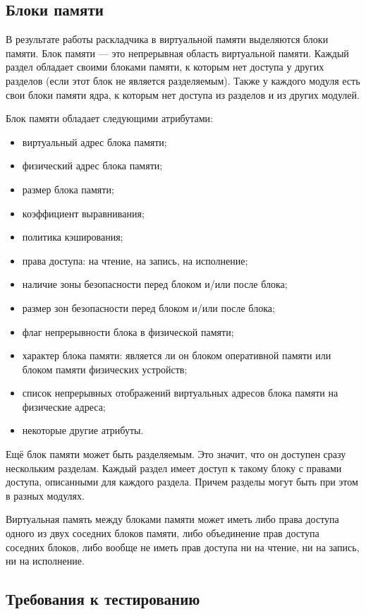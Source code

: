 \documentclass[oneside,senior,etd]{BYUPhys}
\begin{document}
\subsection{Блоки памяти}

В результате работы раскладчика в виртуальной памяти выделяются блоки памяти.
Блок памяти — это непрерывная область виртуальной памяти.
Каждый раздел обладает своими блоками памяти, к которым нет доступа у других разделов
(если этот блок не является разделяемым). Также у каждого модуля есть свои блоки памяти ядра,
к которым нет доступа из разделов и из других модулей.

Блок памяти обладает следующими атрибутами:
\begin{itemize}
  \item виртуальный адрес блока памяти;
  \item физический адрес блока памяти;
  \item размер блока памяти;
  \item коэффициент выравнивания;
  \item политика кэширования;
  \item права доступа: на чтение, на запись, на исполнение;
  \item наличие зоны безопасности перед блоком и/или после блока;
  \item размер зон безопасности перед блоком и/или после блока;
  \item флаг непрерывности блока в физической памяти;
  \item характер блока памяти: является ли он блоком оперативной памяти или блоком памяти
  физических устройств;
  \item список непрерывных отображений виртуальных адресов блока памяти на физические адреса;
  \item некоторые другие атрибуты.
\end{itemize}

Ещё блок памяти может быть разделяемым. Это значит, что он доступен
сразу нескольким разделам. Каждый раздел имеет доступ к такому блоку
с правами доступа, описанными для каждого раздела. Причем разделы
могут быть при этом в разных модулях.

Виртуальная память между блоками памяти может иметь либо права доступа одного из двух
соседних блоков памяти, либо объединение прав доступа соседних блоков, либо вообще
не иметь прав доступа ни на чтение, ни на запись, ни на исполнение.

\subsection{Требования к тестированию}
\end{document}
